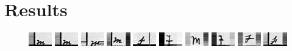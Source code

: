 \section{Results}

\begin{figure}[h]
  \begin{center}
      \includegraphics[width=0.09\textwidth]{images/Subimages/Good/004531795_00006-3.png}
      \includegraphics[width=0.09\textwidth]{images/Subimages/Good/004531795_00006-3.png}
      \includegraphics[width=0.09\textwidth]{images/Subimages/Good/004531795_00006-5.png}
      \includegraphics[width=0.09\textwidth]{images/Subimages/Good/004531795_00009-60.png}
      \includegraphics[width=0.09\textwidth]{images/Subimages/Good/004531795_00009-80.png}
      \includegraphics[width=0.09\textwidth]{images/Subimages/Good/004531795_00195-67.png}
      \includegraphics[width=0.09\textwidth]{images/Subimages/Good/004531795_00195-72.png}
      \includegraphics[width=0.09\textwidth]{images/Subimages/Good/004531795_00195-91.png}
      \includegraphics[width=0.09\textwidth]{images/Subimages/Good/004531795_00439-74.png}
      \includegraphics[width=0.09\textwidth]{images/Subimages/Good/004531795_00009-59.png}

\end{center}
\end{figure}
